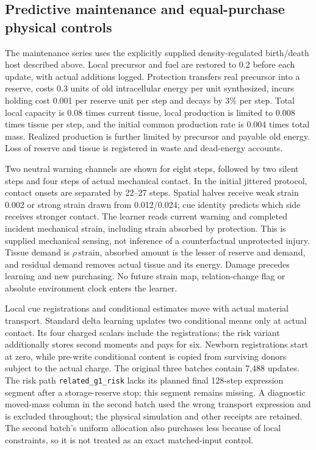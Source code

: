 \subsection*{Predictive maintenance and equal-purchase physical controls}

The maintenance series uses the explicitly supplied density-regulated birth/death host described above. Local precursor and fuel are restored to 0.2 before each update, with actual additions logged. Protection transfers real precursor into a reserve, costs 0.3 units of old intracellular energy per unit synthesized, incurs holding cost 0.001 per reserve unit per step and decays by 3\% per step. Total local capacity is 0.08 times current tissue, local production is limited to 0.008 times tissue per step, and the initial common production rate is 0.004 times total mass. Realized production is further limited by precursor and payable old energy. Loss of reserve and tissue is registered in waste and dead-energy accounts.

Two neutral warning channels are shown for eight steps, followed by two silent steps and four steps of actual mechanical contact. In the initial jittered protocol, contact onsets are separated by 22--27 steps. Spatial halves receive weak strain 0.002 or strong strain drawn from 0.012/0.024; cue identity predicts which side receives stronger contact. The learner reads current warning and completed incident mechanical strain, including strain absorbed by protection. This is supplied mechanical sensing, not inference of a counterfactual unprotected injury. Tissue demand is $\rho\,\mathrm{strain}$, absorbed amount is the lesser of reserve and demand, and residual demand removes actual tissue and its energy. Damage precedes learning and new purchasing. No future strain map, relation-change flag or absolute environment clock enters the learner.

Local cue registrations and conditional estimates move with actual material transport. Standard delta learning updates two conditional means only at actual contact. Its four charged scalars include the registrations; the risk variant additionally stores second moments and pays for six. Newborn registrations start at zero, while pre-write conditional content is copied from surviving donors subject to the actual charge. The original three batches contain 7,488 updates. The risk path \texttt{related\_g1\_risk} lacks its planned final 128-step expression segment after a storage-reserve stop; this segment remains missing. A diagnostic moved-mass column in the second batch used the wrong transport expression and is excluded throughout; the physical simulation and other receipts are retained. The second batch's uniform allocation also purchases less because of local constraints, so it is not treated as an exact matched-input control.

